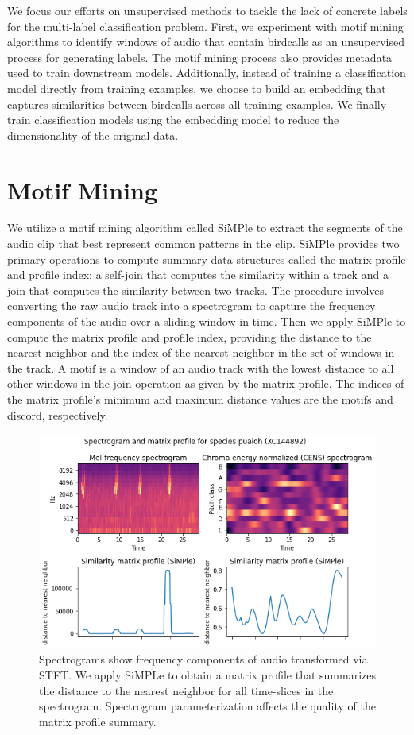 \documentclass[
]{ceurart}
\begin{document}
We focus our efforts on unsupervised methods to tackle the lack of concrete labels for the multi-label classification problem. First, we experiment with motif mining algorithms to identify windows of audio that contain birdcalls as an unsupervised process for generating labels. The motif mining process also provides metadata used to train downstream models. Additionally, instead of training a classification model directly from training examples, we choose to build an embedding that captures similarities between birdcalls across all training examples. We finally train classification models using the embedding model to reduce the dimensionality of the original data.

\section{Motif Mining}

We utilize a motif mining algorithm called SiMPle \cite{silva2018fast} to extract the segments of the audio clip that best represent common patterns in the clip. SiMPle provides two primary operations to compute summary data structures called the matrix profile and profile index: a self-join that computes the similarity within a track and a join that computes the similarity between two tracks. The procedure involves converting the raw audio track into a spectrogram to capture the frequency components of the audio over a sliding window in time. Then we apply SiMPle to compute the matrix profile and profile index, providing the distance to the nearest neighbor and the index of the nearest neighbor in the set of windows in the track. A motif is a window of an audio track with the lowest distance to all other windows in the join operation as given by the matrix profile. The indices of the matrix profile's minimum and maximum distance values are the motifs and discord, respectively.

\begin{figure}[h]
\includegraphics[width=\textwidth]{figures/XC144892-spectrogram-mp.png}
\caption{
    Spectrograms show frequency components of audio transformed via STFT. We apply SiMPLe to obtain a matrix profile that summarizes the distance to the nearest neighbor for all time-slices in the spectrogram. Spectrogram parameterization affects the quality of the matrix profile summary.
}
\label{fig:spectrogram}
\end{figure}
\end{document}
